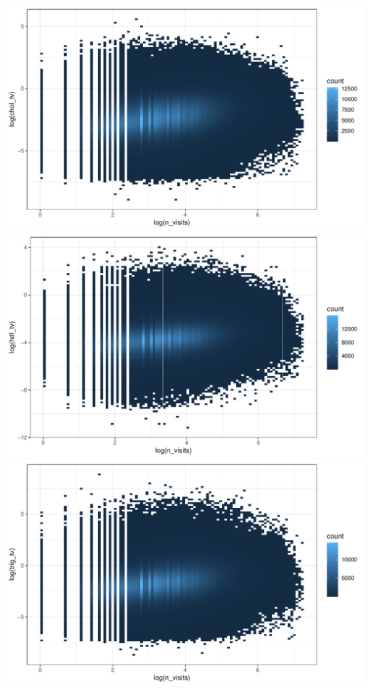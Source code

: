 \documentclass[12pt]{article}
\begin{document}
\begin{center}
\includegraphics[width=.6\textwidth]{nvisits_chol_tv.pdf}
\includegraphics[width=.6\textwidth]{nvisits_hdl_tv.pdf}
\includegraphics[width=.6\textwidth]{nvisits_trig_tv.pdf}
\end{center}

\newpage
\end{document}
